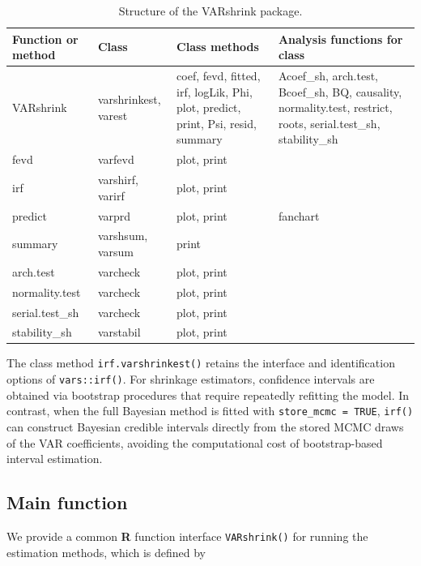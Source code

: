 \begin{table}
\centering
\caption{\label{tab:methods-pdf}Structure of the VARshrink package.}
\centering
\fontsize{9}{11}\selectfont
\begin{tabular}[t]{>{\raggedright\arraybackslash}p{7em}|>{\raggedright\arraybackslash}p{8em}|>{\raggedright\arraybackslash}p{9em}|>{\raggedright\arraybackslash}p{12em}}
\hline
Function or method & Class & Class methods & Analysis functions for class\\
\hline
VARshrink & varshrinkest, varest & coef, fevd, fitted, irf, logLik, Phi, plot, predict, print, Psi, resid, summary & Acoef\_sh, arch.test, Bcoef\_sh, BQ, causality, normality.test, restrict, roots, serial.test\_sh, stability\_sh\\
\hline
fevd & varfevd & plot, print & \\
\hline
irf & varshirf, varirf & plot, print & \\
\hline
predict & varprd & plot, print & fanchart\\
\hline
summary & varshsum, varsum & print & \\
\hline
arch.test & varcheck & plot, print & \\
\hline
normality.test & varcheck & plot, print & \\
\hline
serial.test\_sh & varcheck & plot, print & \\
\hline
stability\_sh & varstabil & plot, print & \\
\hline
\end{tabular}
\end{table}

The class method \texttt{irf.varshrinkest()} retains the interface and identification options of \texttt{vars::irf()}. For shrinkage estimators, confidence intervals are obtained via bootstrap procedures that require repeatedly refitting the model. In contrast, when the full Bayesian method is fitted with \texttt{store\_mcmc\ =\ TRUE}, \texttt{irf()} can construct Bayesian credible intervals directly from the stored MCMC draws of the VAR coefficients, avoiding the computational cost of bootstrap-based interval estimation.

\subsection{Main function}\label{main-function}

We provide a common \textbf{R} function interface \texttt{VARshrink()}
for running the estimation methods, which is defined by

